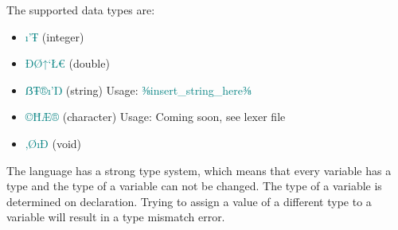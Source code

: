 The supported data types are:
\begin{itemize}[noitemsep]
    \item \textcolor{teal}{ı’Ŧ} (integer)
    \item \textcolor{teal}{ÐØ↑‘Ł€} (double)
    \item \textcolor{teal}{ẞŦ®ı’Ŋ} (string) Usage: \textcolor{teal}{⅜insert\_string\_here⅜}
    \item \textcolor{teal}{©ĦÆ®} (character) Usage: Coming soon, see lexer file
    \item \textcolor{teal}{‚ØıÐ} (void)
\end{itemize}
\noindent
The language has a strong type system, which means that every variable has a type and
the type of a variable can not be changed. The type of a variable is determined on declaration.
Trying to assign a value of a different type to a variable will result in a type mismatch error.

